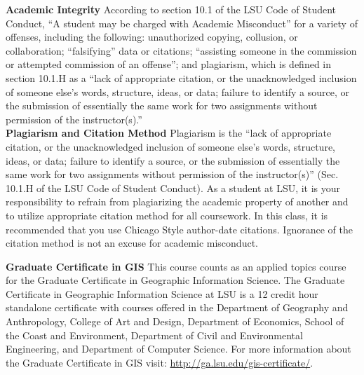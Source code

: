 \documentclass[11pt,article,oneside]{memoir}
\begin{document}
\noindent \textbf{Academic Integrity}
According to section 10.1 of the LSU Code of Student Conduct, ``A student may be charged with Academic Misconduct'' for a variety of offenses, including the following: unauthorized copying, collusion, or collaboration; ``falsifying'' data or citations; ``assisting someone in the commission or attempted commission of an offense''; and plagiarism, which is defined in section 10.1.H as a ``lack of appropriate citation, or the unacknowledged inclusion of someone else's words, structure, ideas, or data; failure to identify a source, or the submission of essentially the same work for two assignments without permission of the instructor(s).''\\

\noindent \textbf{Plagiarism and Citation Method}
Plagiarism is the ``lack of appropriate citation, or the unacknowledged inclusion of someone else's words, structure, ideas, or data; failure to identify a source, or the submission of essentially the same work for two assignments without permission of the instructor(s)'' (Sec. 10.1.H of the LSU Code of Student Conduct). As a student at LSU, it is your responsibility to refrain from plagiarizing the academic property of another and to utilize appropriate citation method for all coursework. In this class, it is recommended that you use Chicago Style author-date citations. Ignorance of the citation method is not an excuse for academic misconduct. 

\noindent \textbf{Graduate Certificate in GIS}
This course counts as an applied topics course for the 
Graduate Certificate in Geographic Information Science.
The Graduate Certificate in Geographic Information Science at LSU 
is a 12 credit hour standalone certificate with courses offered 
in the Department of Geography and Anthropology, College of Art and Design, 
Department of Economics, School of the Coast and Environment, 
Department of Civil and Environmental Engineering, 
and Department of Computer Science. 
For more information about the Graduate Certificate in GIS visit: 
\url{http://ga.lsu.edu/gis-certificate/}.

\end{document}
